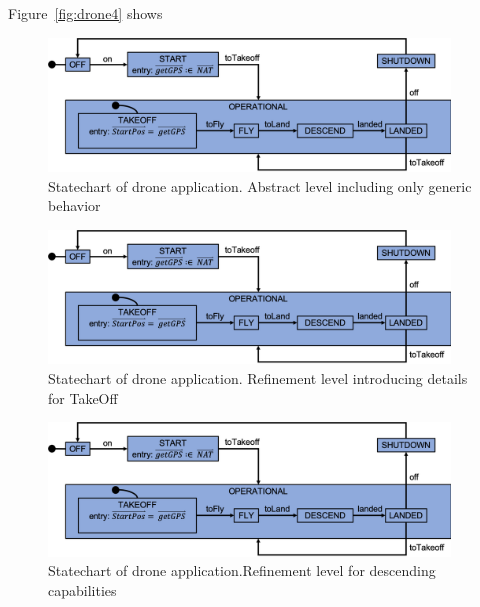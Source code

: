 Figure~\ref{fig:drone4} shows

\begin{figure}[!h]
	\vspace{-.4cm}
	\centering
	\includegraphics[width=0.95\textwidth]{figures/Picture1.png}
	\caption{Statechart of drone application. Abstract level including only generic behavior }
	\label{fig:drone1}
	\vspace{-.4cm}
\end{figure} 

\begin{figure}[!h]
	\centering
	\includegraphics[width=0.95\textwidth]{figures/Picture2.png}
	\caption{Statechart of drone application. Refinement level introducing details for TakeOff}
	\label{fig:drone2}
\end{figure} 

\begin{figure}[!h]
	\centering
	\includegraphics[width=0.95\textwidth]{figures/Picture2.png}
	\caption{Statechart of drone application.Refinement level for descending capabilities}
	\label{fig:drone3}
\end{figure} 

